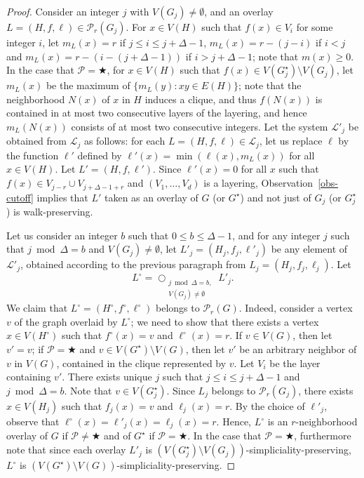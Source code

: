 \documentclass[a4paper,11pt]{article}
\newcommand{\LL}{{\mathcal L}}
\newcommand{\PP}{{\mathcal P}}
\begin{document}
\begin{proof}
Consider an integer $j$ with $V(G_j)\neq\emptyset$, and an overlay $L=(H,f,\ell)\in\PP_r(G_j)$.  For $x\in V(H)$ such that $f(x)\in V_i$ for some integer $i$, let $m_L(x)=r$
if $j\le i\le j+\Delta-1$, $m_L(x)=r-(j-i)$ if $i<j$ and $m_L(x)=r-(i-(j+\Delta-1))$ if $i>j+\Delta-1$;
note that $m(x)\ge 0$.  In the case that $\PP=\bigstar$, for $x\in V(H)$ such that $f(x)\in V(G^\star_j)\setminus V(G_j)$, let $m_L(x)$ be the maximum of $\{m_L(y):xy\in E(H)\}$;
note that the neighborhood $N(x)$ of $x$ in $H$ induces a clique, and thus $f(N(x))$ is contained in at most two consecutive layers
of the layering, and hence $m_L(N(x))$ consists of at most two consecutive integers.
Let the system $\LL'_j$ be obtained from $\LL_j$ as follows: for each $L=(H,f,\ell)\in \LL_j$, let us replace $\ell$ by the function $\ell'$
defined by $\ell'(x)=\min(\ell(x),m_L(x))$ for all $x\in V(H)$.
Let $L'=(H,f,\ell')$.  Since $\ell'(x)=0$ for all $x$ such that $f(x)\in V_{j-r}\cup V_{j+\Delta-1+r}$
and $(V_1,\ldots,V_d)$ is a layering, Observation~\ref{obs-cutoff} implies that $L'$ taken as an overlay of $G$ (or $G^\star$) and not just of $G_j$ (or $G^\star_j$)
is walk-preserving.

Let us consider an integer $b$ such that $0\le b\le \Delta-1$, and for any integer $j$ such that $j\bmod \Delta=b$ and $V(G_j)\neq\emptyset$,
let $L'_j=(H_j,f_j,\ell'_j)$ be any element of $\LL'_j$, obtained according to the previous paragraph from $L_j=(H_j,f_j,\ell_j)$.  Let
$$L^\circ=\bigcirc_{\substack{j\bmod \Delta=b,\\V(G_j)\neq\emptyset}} L'_j.$$
We claim that $L^\circ=(H^\circ,f^\circ,\ell^\circ)$ belongs to $\PP_r(G)$.
Indeed, consider a vertex $v$ of the graph overlaid by $L^\circ$; we need to show that there exists a vertex $x\in V(H^\circ)$ such
that $f^\circ(x)=v$ and $\ell^\circ(x)=r$.
If $v\in V(G)$, then let $v'=v$; if $\PP=\bigstar$ and $v\in V(G^\star)\setminus V(G)$, then let $v'$ be an arbitrary neighbor of $v$ in $V(G)$,
contained in the clique represented by $v$.  Let $V_i$ be the layer containing $v'$.  There exists unique $j$ such that $j\le i\le j+\Delta-1$
and $j\bmod\Delta=b$.  Note that $v\in V(G^\star_j)$.  Since $L_j$ belongs to $\PP_r(G_j)$, there exists $x\in V(H_j)$ such that $f_j(x)=v$ and $\ell_j(x)=r$.
By the choice of $\ell'_j$, observe that $\ell^\circ(x)=\ell'_j(x)=\ell_j(x)=r$.  Hence, $L^\circ$ is an $r$-neighborhood overlay of $G$ if $\PP\neq\bigstar$ and of $G^\star$ if $\PP=\bigstar$.
In the case that $\PP=\bigstar$, furthermore note that since each overlay $L'_j$ is $(V(G^\star_j)\setminus V(G_j))$-simpliciality-preserving,
$L^\circ$ is $(V(G^\star)\setminus V(G))$-simpliciality-preserving.


\end{proof}
\end{document}
